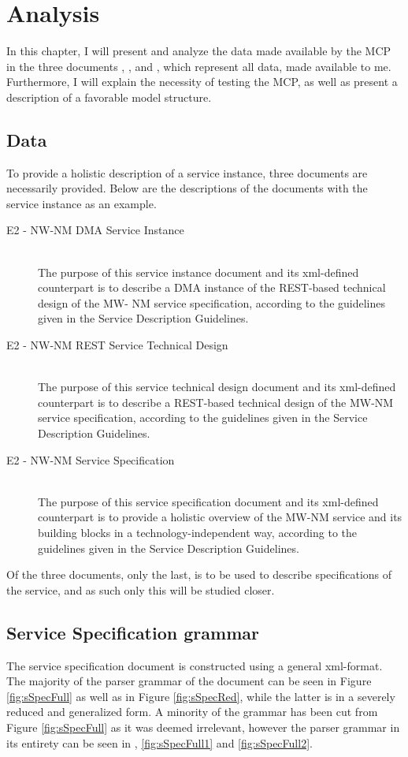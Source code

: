 \chapter{Analysis}

In this chapter, I will present and analyze the data made available by the MCP in the three documents , , and , which represent all data, made available to me. Furthermore, I will explain the necessity of testing the MCP, as well as present a description of a favorable model structure. 

\section{Data}

To provide a holistic description of a service instance, three documents are necessarily provided. Below are the descriptions of the documents with the service instance  as an example.
\begin{description}
	\item[E2 - NW-NM DMA Service Instance]\ \\
		The purpose of this service instance document and its xml-defined counterpart is to describe a DMA instance of the REST-based technical design of the MW- NM service specification, according to the guidelines given in the Service Description Guidelines.
	\item[E2 - NW-NM REST Service Technical Design]\ \\
		The purpose of this service technical design document and its xml-defined counterpart is to describe a REST-based technical design of the MW-NM service specification, according to the guidelines given in the Service Description Guidelines.
	\item[E2 - NW-NM Service Specification]\ \\
		The purpose of this service specification document and its xml-defined counterpart is to provide a holistic overview of the MW-NM service and its building blocks in a technology-independent way, according to the guidelines given in the Service Description Guidelines.
\end{description}
Of the three documents, only the last,  is to be used to describe specifications of the service, and as such only this will be studied closer.
\section{Service Specification grammar}
The service specification document is constructed using a general xml-format. The majority of the parser grammar of the document can be seen in Figure \ref{fig:sSpecFull} as well as in Figure \ref{fig:sSpecRed}, while the latter is in a severely reduced and generalized form. A minority of the grammar has been cut from Figure \ref{fig:sSpecFull} as it was deemed irrelevant, however the parser grammar in its entirety can be seen in , \ref{fig:sSpecFull1} and \ref{fig:sSpecFull2}.

